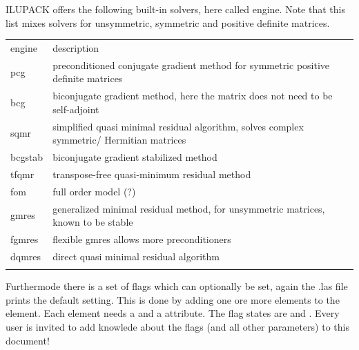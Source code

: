 ILUPACK offers the following built-in solvers, here called engine. Note that this list mixes solvers for unsymmetric, symmetric and positive definite matrices.
\begin{center}
\begin{tabular}{lp{}}
\hline\noalign{\smallskip}
engine & description \\
\noalign{\smallskip}\hline\noalign{\smallskip}
pcg & preconditioned conjugate gradient method for symmetric positive definite matrices\\
bcg & biconjugate gradient method, here the matrix does not need to be self-adjoint\\ 
sqmr & simplified quasi minimal residual algorithm, solves complex symmetric/ Hermitian matrices\\
bcgstab & biconjugate gradient stabilized method\\
tfqmr & transpose-free quasi-minimum residual method\\
fom & full order model (?)\\
gmres & generalized minimal residual method, for unsymmetric matrices, known to be stable\\
fgmres & flexible gmres allows more preconditioners\\
dqmres & direct quasi minimal residual algorithm\\
\noalign{\smallskip}\hline
\end{tabular}
\end{center}
Furthermode there is a set of flags which can optionally be set, again the .las file prints the default setting. This is done by adding one ore more  elements to the  element. Each element needs a  and a  attribute. The flag states are  and . Every user is invited to add knowlede about the flags (and all other parameters) to this document!

